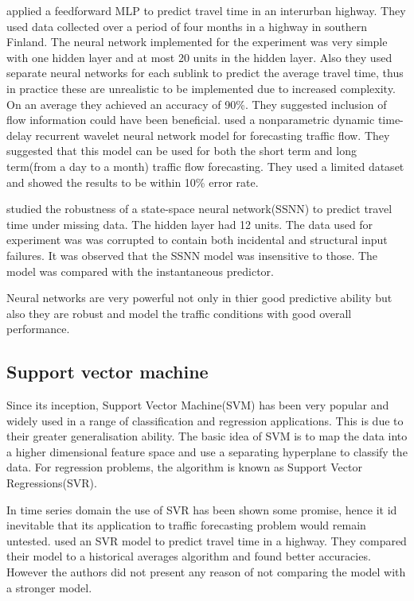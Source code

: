 \citet{innamaa2005short} applied a feedforward MLP to predict travel time in an interurban highway.
They used data collected over a period of four months in a highway in southern Finland. The neural
network implemented for the experiment was very simple with one hidden layer and at most 20 units in
the hidden layer. Also they used separate neural networks for each sublink to predict the average
travel time, thus in practice these are unrealistic to be implemented due to increased complexity.
On an average they achieved an accuracy of 90\%. They suggested inclusion of flow information could
have been beneficial. \citet{jiang2005dynamic} used a nonparametric dynamic time-delay recurrent
wavelet neural network model for forecasting traffic flow. They suggested that this model can be
used for both the short term and long term(from a day to a month) traffic flow forecasting. They
used a limited dataset and showed the results to be within 10\% error rate.

\citet{van2005accurate} studied the robustness of a state-space neural network(SSNN) to predict
travel time under missing data. The hidden layer had 12 units. The data used for experiment was
was corrupted to contain both incidental and structural input failures. It was observed that the
SSNN model was insensitive to those. The model was compared with the instantaneous predictor.


Neural networks are very powerful not only in thier good predictive ability but also they are robust
and model the traffic conditions with good overall performance.

\subsection{Support vector machine}
Since its inception, Support Vector Machine(SVM) has been very popular and widely used in a range of
classification and regression applications. This is due to their greater generalisation ability.
The basic idea of SVM is to map the data into a higher dimensional feature space and use a separating
hyperplane to classify the data. For regression problems, the algorithm is known as Support Vector
Regressions(SVR).


In time series domain the use of SVR has been shown some promise, hence it id inevitable that its
application to traffic forecasting problem would remain untested. \citet{wu2004travel} used an SVR
model to predict travel time in a highway. They compared their model to a historical averages algorithm
and found better accuracies. However the authors did not present any reason of not comparing the model
with a stronger model.


